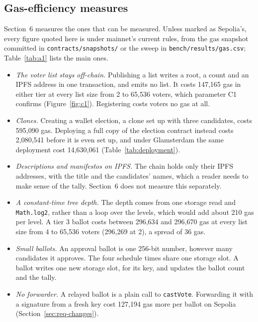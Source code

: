 \subsection{Gas-efficiency measures}\label{sec:gas-measures}

Section~6 measures the ones that can be measured. Unless marked as Sepolia's, every figure quoted here is under mainnet's current rules, from the
gas snapshot committed in \texttt{contracts/snapshots/} or the sweep in
\texttt{bench/results/gas.csv}; Table~\ref{tab:a1} lists the main ones.

\begin{itemize}
  \item \emph{The voter list stays off-chain.} Publishing a list writes a root,
        a count and an IPFS address in one transaction, and emits no list. It
        costs 147,165 gas in either tier at every list size
        from 2 to 65,536 voters, which parameter C1 confirms
        (Figure~\ref{fig:c1}). Registering costs voters no gas at all.
  \item \emph{Clones.} Creating a wallet election, a clone set up with three
        candidates, costs 595,090 gas. Deploying a full copy of the election
        contract instead costs 2,080,541 before it is even set up, and under
        Glamsterdam the same deployment cost 14,630,061
        (Table~\ref{tab:deployment}).
  \item \emph{Descriptions and manifestos on IPFS.} The chain holds only their
        IPFS addresses, with the title and the candidates' names, which a reader
        needs to make sense of the tally. Section~6 does not measure this
        separately.
  \item \emph{A constant-time tree depth.} The depth comes from one storage
        read and \texttt{Math.log2}, rather than a loop over the levels, which
        would add about 210 gas per level. A tier 3 ballot costs between
        296,634 and 296,670 gas at every list size from 4 to 65,536 voters
        (296,269 at 2), a spread of 36 gas.
  \item \emph{Small ballots.} An approval ballot is one 256-bit number,
        however many candidates it approves. The four schedule times share one
        storage slot. A ballot writes one new storage slot, for its key, and
        updates the ballot count and the tally.
  \item \emph{No forwarder.} A relayed ballot is a plain call to
        \texttt{castVote}. Forwarding it with a signature from a fresh key
        cost 127,194 gas more per ballot on Sepolia
        (Section~\ref{sec:req-changes}).
\end{itemize}

